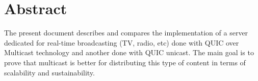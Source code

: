 \section*{Abstract}
{
    The present document describes and compares the implementation of a server dedicated for real-time broadcasting (TV, radio, etc)
    done with QUIC over Multicast technology and another done with QUIC unicast. The main goal is to prove that multicast is 
    better for distributing this type of content in terms of scalability and sustainability.
}
